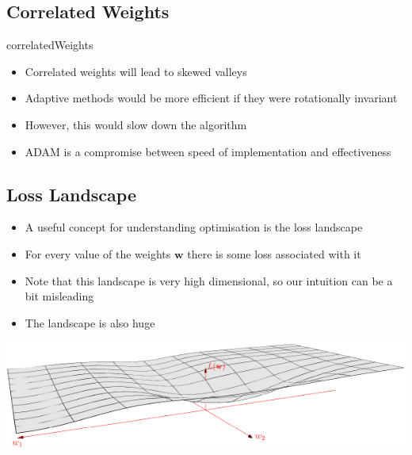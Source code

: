 
\begin{slide}
  \section{Correlated Weights}

  \begin{rightImage}{correlatedWeights}
    \begin{PauseHighLight}
      \begin{itemize}
      \item Correlated weights will lead to skewed valleys\pause
      \item Adaptive methods would be more efficient if they were
        rotationally invariant\pause
      \item However, this would slow down the algorithm\pause
      \item ADAM is a compromise between speed of implementation and
        effectiveness\pause
      \end{itemize}
    \end{PauseHighLight}

  \end{rightImage}

\end{slide}


\Outline %

\begin{slide}
\section[-2]{Loss Landscape}

\begin{PauseHighLight}
  \begin{itemize}\squeeze
  \item A useful concept for understanding optimisation is the loss
    landscape\pause
  \item For every value of the weights $\bm{w}$ there is some loss
    associated with it\pause
  \item Note that this landscape is very high dimensional, so our
    intuition can be a bit misleading\pause
  \item The landscape is also huge
  \end{itemize}
  \begin{center}
    \includegraphics[width=0.9\linewidth]{lossLandscape.png}\pause
  \end{center}
\end{PauseHighLight}

\end{slide}

